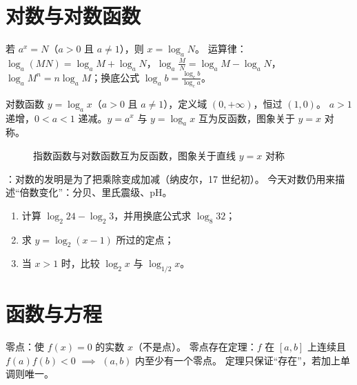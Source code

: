 \begin{procedure}
\section{对数与对数函数}
若 $a^x=N$（$a>0$ 且 $a\neq1$），则 $x=\log_a N$。
运算律：$\log_a(MN)=\log_a M+\log_a N$，$\log_a\frac{M}{N}=\log_a M-\log_a N$，
$\log_a M^n=n\log_a M$；换底公式 $\log_a b=\frac{\log_c b}{\log_c a}$。

对数函数 $y=\log_a x$（$a>0$ 且 $a\neq1$），定义域 $(0,+\infty)$，恒过 $(1,0)$。
$a>1$ 递增，$0<a<1$ 递减。$y=a^x$ 与 $y=\log_a x$ 互为反函数，图象关于 $y=x$ 对称。

\begin{figure}[htbp]
  \centering
  \caption{指数函数与对数函数互为反函数，图象关于直线 $y=x$ 对称}
\end{figure}

：对数的发明是为了把乘除变成加减（纳皮尔，17 世纪初）。
今天对数仍用来描述“倍数变化”：分贝、里氏震级、pH。

\begin{exercise}
\begin{enumerate}
  \item 计算 $\log_2 24-\log_2 3$，并用换底公式求 $\log_8 32$；
  \item 求 $y=\log_2(x-1)$ 所过的定点；
  \item 当 $x>1$ 时，比较 $\log_2 x$ 与 $\log_{1/2} x$。
\end{enumerate}
\end{exercise}

\section{函数与方程}
零点：使 $f(x)=0$ 的实数 $x$（不是点）。
零点存在定理：$f$ 在 $[a,b]$ 上连续且 $f(a)f(b)<0$ $\implies$ $(a,b)$ 内至少有一个零点。
定理只保证“存在”，若加上单调则唯一。


\end{procedure}
